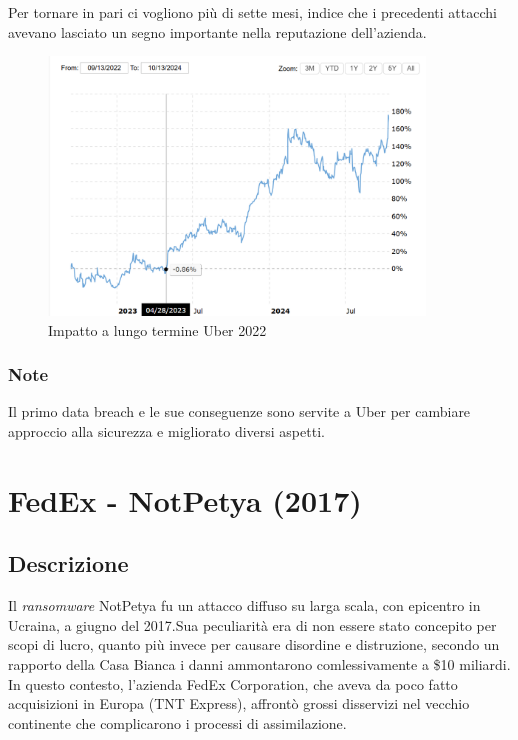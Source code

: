 \documentclass[12pt,a4paper,openright,twoside]{report}
\begin{document}
Per tornare in pari ci vogliono pi\`u di sette mesi, indice che i precedenti attacchi avevano lasciato un segno importante nella reputazione dell'azienda.\\

\begin{figure}[H] 
\begin{center} 
\includegraphics[width=10cm]{figures/uber_2022_long.png} 
\caption[Grafico Uber 2022 long]{Impatto a lungo termine Uber 2022}\label{fig:ubr2}
\end{center}
\end{figure}

\subsubsection{Note}
Il primo data breach e le sue conseguenze sono servite a Uber per cambiare approccio alla sicurezza e migliorato diversi aspetti\cite{Uber_2022}.

\section{FedEx - NotPetya (2017)}
\subsection{Descrizione}
Il \textit{ransomware} NotPetya fu un attacco diffuso su larga scala, con epicentro in Ucraina, a giugno del 2017.Sua  peculiarit\`a era di non essere stato concepito per scopi di lucro, quanto pi\`u invece per causare disordine e distruzione\cite{FedEx_evolutionOfRansom}, secondo un rapporto della Casa Bianca i danni ammontarono comlessivamente a \$10 miliardi\cite{FedEx_wired}.\\
In questo contesto, l'azienda FedEx Corporation, che aveva da poco fatto acquisizioni in Europa (TNT Express), affront\`o grossi disservizi nel vecchio continente che complicarono i processi di assimilazione\cite{FedEx_10K_report_2018}.\\
\end{document}
